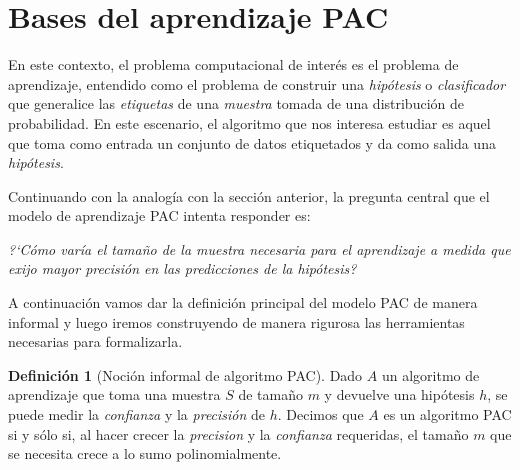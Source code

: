 \documentclass{article}
\theoremstyle{definition}
\newtheorem{definition}{Definici\'on}%
\begin{document}
\section{Bases del aprendizaje PAC}
\label{sec:pac}

En este contexto, el problema computacional de inter\'es es el problema de aprendizaje, entendido como el problema de construir una \emph{hip\'otesis} o \emph{clasificador} que generalice las \emph{etiquetas} de una \emph{muestra} tomada de una distribuci\'on de probabilidad. En este escenario, el algoritmo que nos interesa estudiar es aquel que toma como entrada un conjunto de datos etiquetados y da como salida una \emph{hip\'otesis}.

\begin{center}
\end{center}

Continuando con la analog\'ia con la secci\'on anterior, la pregunta central que el modelo de aprendizaje PAC intenta responder es:

\begin{center}
    \emph{?`C\'omo var\'ia el tama\~no de la muestra necesaria para el aprendizaje a medida que exijo mayor precisi\'on en las predicciones de la hip\'otesis?}    
\end{center}

A continuaci\'on vamos dar la definici\'on principal del modelo PAC de manera informal y luego iremos construyendo de manera rigurosa las herramientas necesarias para formalizarla.

\begin{definition}[Noci\'on informal de algoritmo PAC]
    Dado $A$ un algoritmo de aprendizaje que toma una muestra $S$ de tama\~no $m$ y devuelve una hip\'otesis $h$, se puede medir la \emph{confianza} y la \emph{precisi\'on} de $h$. Decimos que $A$ es un algoritmo PAC si y s\'olo si, al hacer crecer la \emph{precision} y la \emph{confianza} requeridas, el tama\~no $m$ que se necesita crece a lo sumo polinomialmente.
\end{definition}
\end{document}
